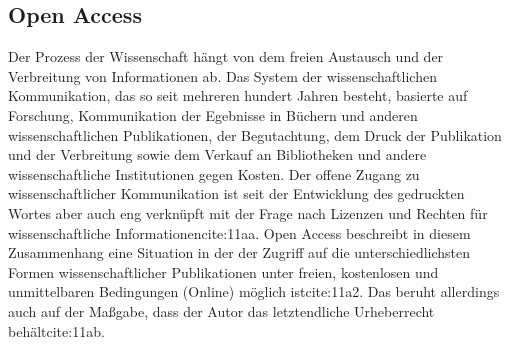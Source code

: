 \subsection{Open Access} 
Der Prozess der Wissenschaft hängt von dem freien Austausch und der Verbreitung von Informationen ab\cite{cite:11}. Das System der wissenschaftlichen Kommunikation, das so seit mehreren hundert Jahren besteht, basierte auf Forschung, Kommunikation der Egebnisse in Büchern und anderen wissenschaftlichen Publikationen, der Begutachtung, dem Druck der Publikation und der Verbreitung sowie dem Verkauf an Bibliotheken und andere wissenschaftliche Institutionen gegen Kosten\cite{cite:11a}. Der offene Zugang zu wissenschaftlicher Kommunikation ist seit der Entwicklung des gedruckten Wortes aber auch eng verknüpft mit der Frage nach Lizenzen und Rechten für wissenschaftliche Informationen{cite:11aa}. Open Access beschreibt in diesem Zusammenhang eine Situation in der der Zugriff auf die unterschiedlichsten Formen wissenschaftlicher Publikationen unter freien, kostenlosen und unmittelbaren Bedingungen (Online) möglich ist{cite:11a2}. Das beruht allerdings auch auf der Maßgabe, dass der Autor das letztendliche Urheberrecht behält{cite:11ab}.

